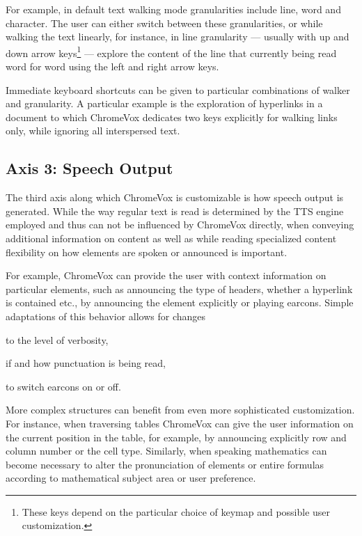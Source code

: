 \documentclass{acm_proc_article-sp}
\begin{document}
For example, in default text walking mode granularities include line, word and
character. The user can either switch between these granularities, or while
walking the text linearly, for instance, in line granularity --- usually with up
and down arrow keys\footnote{These keys depend on the particular choice of
  keymap and possible user customization.}  --- explore the content of the line
that currently being read word for word using the left and right arrow keys.

Immediate keyboard shortcuts can be given to particular combinations of walker
and granularity. A particular example is the exploration of hyperlinks in a
document to which ChromeVox dedicates two keys explicitly for walking links
only, while ignoring all interspersed text.

\subsection{Axis 3: Speech Output}
\label{sec:ax3}

The third axis along which ChromeVox is customizable is how speech output is
generated. While the way regular text is read is determined by the TTS engine
employed and thus can not be influenced by ChromeVox directly, when conveying
additional information on content as well as while reading specialized content
flexibility on how elements are spoken or announced is important.

For example, ChromeVox can provide the user with context information on
particular elements, such as announcing the type of headers, whether a hyperlink
is contained etc., by announcing the element explicitly or playing
earcons. Simple adaptations of this behavior allows for changes
\begin{inparaenum}[(a)]
\item to the level of verbosity,
\item if and how punctuation is being read,
\item to switch earcons on or off.
\end{inparaenum}

More complex structures can benefit from even more sophisticated customization.
For instance, when traversing tables ChromeVox can give the user information on
the current position in the table, for example, by announcing explicitly row and
column number or the cell type. Similarly, when speaking mathematics can become
necessary to alter the pronunciation of elements or entire formulas according to
mathematical subject area or user preference.
\end{document}
